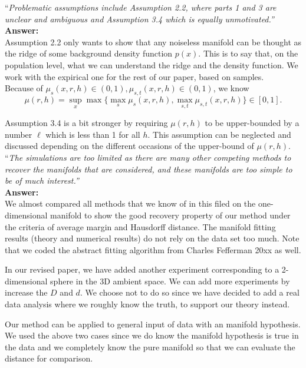 \documentclass[12pt]{article}
\begin{document}
\noindent ``\textit{Problematic assumptions include Assumption 2.2, where parts 1 and 3 are unclear and ambiguous and Assumption 3.4 which is equally unmotivated.''}\\

{\bf Answer:}\\
Assumption 2.2 only wants to show that any noiseless manifold can be thought as the ridge of some background density function $p(x)$. This is to say that, on the population level, what we can understand the ridge and the density function. We work with the expirical one for the rest of our paper, based on samples.\\


Because of $\mu_s(x,r,h)\in(0,1),\mu_{s,t}(x,r,h)\in (0,1)$, we know 
\[
\mu(r,h) = \sup_x \max\{\max_s \mu_s(x,r,h), \max_{s,t}\mu_{s,t}(x,r,h)\}\in [0,1].
\]

Assumption 3.4 is a bit stronger by requiring $\mu(r,h)$ to be upper-bounded by a number $\ell$ which is less than 1 for all $h$. This assumption can be neglected and discussed depending on the different occasions of the upper-bound of $\mu(r,h)$. \\


\noindent ``\textit{The simulations are too limited as there are many other competing methods to recover the manifolds that are considered, and these manifolds are too simple to be of much interest.'' }\\

{\bf Answer:}\\
We almost compared all methods that we know of in this filed on the one-dimensional manifold to show the good recovery property of our method under the criteria of average margin and Hausdorff distance. The manifold fitting results (theory and numerical results) do not rely on the data set too much. Note that we coded the abstract fitting algorithm from  Charles Fefferman 20xx as well. 

In our revised paper, we have added another experiment corresponding to a 2-dimensional sphere in the 3D ambient space. We can add more experiments by increase the $D$ and $d$. We choose not to do so since we have decided to  add a real data analysis where we roughly know the truth, to support our theory instead. 

Our method can be applied to general input of data with an manifold hypothesis. We used the above two cases since we do know the manifold hypothesis is true in the data and we completely know the pure manifold so that we can evaluate the distance for comparison.
\end{document}
